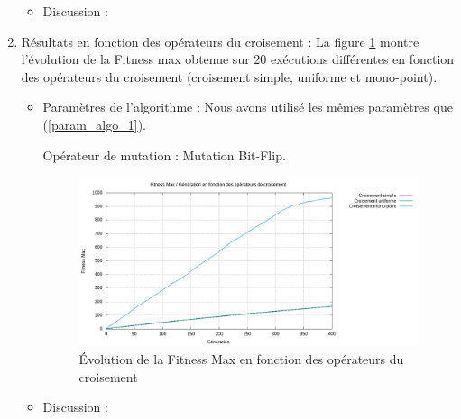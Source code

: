 \documentclass[12pt]{article}
\begin{document}
\begin{enumerate}
\begin{itemize}
\item{Discussion :}

\end{itemize}
\item{Résultats en fonction des opérateurs du croisement : } La figure \ref{fitness_op_crois} montre l'évolution de la Fitness max obtenue sur 20 exécutions différentes en fonction des opérateurs du croisement (croisement simple, uniforme et mono-point).
\begin{itemize}
\item{Paramètres de l'algorithme : }  Nous avons utilisé les mêmes paramètres que (\ref{param_algo_1}). 
	\begin{itemize}
	Opérateur de mutation : Mutation Bit-Flip.
	\end{itemize}  
 
\begin{figure}[H]
		\begin{center}
			\includegraphics[scale=0.5]{img/fitness_op_crois.png}
			\caption{Évolution de la Fitness Max en fonction des opérateurs du croisement}
			\label{fitness_op_crois}
		\end{center}
\end{figure} 

\item{Discussion :}
\end{itemize}

\end{enumerate}
\end{document}
